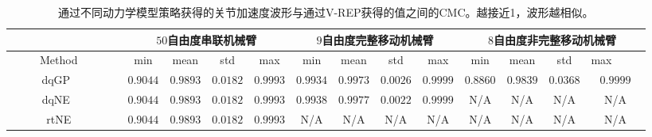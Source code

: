 \begin{table*}[t]
\caption{通过不同动力学模型策略获得的关节加速度波形与通过V-REP获得的值之间的CMC。越接近1，波形越相似。\label{tab:cmc}}

\centering{}{\small{}}%
\begin{tabular}{cc|cccc|cccc|cccc}
\hline 
 & \multicolumn{1}{c}{} & \multicolumn{4}{c}{{\small{}\hspace{1mm}$50$自由度串联机械臂}} & \multicolumn{4}{c}{{\small{}$9$自由度完整移动机械臂}} & \multicolumn{4}{c}{{\small{}~~$8$自由度非完整移动机械臂~~}}\tabularnewline
\hline 
{\small{}~~~~~Method~~~~~} &  & {\small{}\hspace{4mm}min\hspace{4mm}} & {\small{}\hspace{4mm}mean\hspace{4mm}} & {\small{}\hspace{4mm}std\hspace{4mm}} & {\small{}\hspace{4mm}max\hspace{4mm}} & {\small{}\hspace{4mm}min\hspace{4mm}} & {\small{}\hspace{4mm}mean\hspace{4mm}} & {\small{}\hspace{4mm}std\hspace{4mm}} & {\small{}\hspace{4mm}max\hspace{4mm}} & {\small{}\hspace{4mm}min\hspace{4mm}} & {\small{}\hspace{4mm}mean\hspace{4mm}} & {\small{}\hspace{4mm}std\hspace{4mm}} & {\small{}\hspace{4mm}max~~~~~}\tabularnewline
\hline 
\multicolumn{2}{c|}{{\small{}dqGP~~~}} & {\small{}$0.9044$} & {\small{}$0.9893$} & {\small{}$0.0182$} & {\small{}$0.9993$} & {\small{}$0.9934$} & {\small{}$0.9973$} & {\small{}$0.0026$} & {\small{}$0.9999$} & {\small{}$0.8860$} & {\small{}$0.9839$} & {\small{}$0.0368$} & {\small{}$0.9999$}\tabularnewline
\multicolumn{2}{c|}{{\small{}dqNE~~~}} & {\small{}$0.9044$} & {\small{}$0.9893$} & {\small{}$0.0182$} & {\small{}$0.9993$} & {\small{}$0.9938$} & {\small{}$0.9977$} & {\small{}$0.0022$} & {\small{}$0.9999$} & {\small{}N/A} & {\small{}N/A} & {\small{}N/A} & {\small{}N/A}\tabularnewline
\multicolumn{2}{c|}{{\small{}rtNE~~}} & {\small{}$0.9044$} & {\small{}$0.9893$} & {\small{}$0.0182$} & {\small{}$0.9993$} & {\small{}N/A} & {\small{}N/A} & {\small{}N/A} & {\small{}N/A} & {\small{}N/A} & {\small{}N/A} & {\small{}N/A} & {\small{}N/A}\tabularnewline
\hline 
\end{tabular}{\small\par}
\end{table*}

